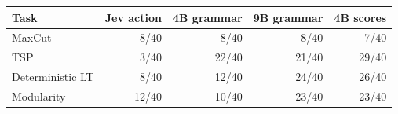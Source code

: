 \begin{tabular}{lrrrr}
\toprule
Task & Jev action & 4B grammar & 9B grammar & 4B scores \\
\midrule
MaxCut & 8/40 & 8/40 & 8/40 & 7/40 \\
TSP & 3/40 & 22/40 & 21/40 & 29/40 \\
Deterministic LT & 8/40 & 12/40 & 24/40 & 26/40 \\
Modularity & 12/40 & 10/40 & 23/40 & 23/40 \\
\bottomrule
\end{tabular}
